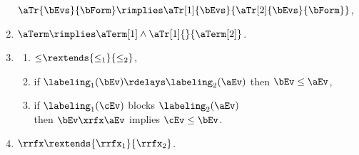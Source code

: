 \begin{definition}
\begin{multicols}{2}
\begin{enumerate}[topsep=0pt,label=(\textsc{s}\arabic*),ref=\textsc{s}\arabic*]
      $\aTr{\bEvs}{\bForm} \rimplies \aTr[1]{\bEvs}{\aTr[2]{\bEvs}{\bForm}}$,
    \item \label{seq-term}
      $\aTerm \rimplies \aTerm[1]\land\aTr[1]{}{\aTerm[2]}$.
    \item[] \label{par-le}
      \begin{enumerate}[leftmargin=0pt]
      \item \label{seq-le-extends}
        ${\le}\rextends{\le_1}{\le_2}$, 
      \item \label{seq-le-delays}
        if $\labeling_1(\bEv) \rdelays \labeling_2(\aEv)$ then $\bEv\le\aEv$,
      \item \label{seq-le-blocks}
        if $\labeling_1(\cEv)$ blocks $\labeling_2(\aEv)$\\
        then $\bEv\xrfx\aEv$ implies $\cEv\le\bEv$.
      \end{enumerate}
    \item \label{seq-rf-extends}
      ${\rrfx}\rextends{\rrfx_1}{\rrfx_2}$.
    \end{enumerate}
  \end{multicols}
  \medskip


\end{definition}
